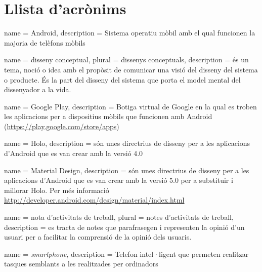 \chapter*{Llista d'acrònims}
\label{sec:glossary}


\begin{acronym}
\end{acronym}


{
name = Android, description = Sistema operatiu mòbil amb el qual funcionen la majoria de telèfons mòbils \cite{Android_OS}
}

{
name = disseny conceptual, plural = dissenys conceptuals, description = {és un tema, noció o idea amb el propòsit de comunicar una visió del disseny del sistema o producte. És la part del disseny del sistema que porta el model mental del dissenyador a la vida.}
}

{
name = Google Play, description = Botiga virtual de Google en la qual es troben les aplicacions per a dispositius mòbils que funcionen amb \gls{Android} (\url{https://play.google.com/store/apps})
}

{
name = Holo, description = són unes directrius de disseny per a les aplicacions d'\gls{Android} que es van crear amb la versió 4.0
}

{
name = Material Design, description = són unes directrius de disseny per a les aplicacions d'Android que es van crear amb la versió 5.0 per a substituir i millorar Holo. Per més informació \url{http://developer.android.com/design/material/index.html}
}

{
name = nota d'activitats de treball, plural = notes d'activitats de treball, description = es tracta de notes que parafrasegen i representen la opinió d'un usuari per a facilitar la comprensió de la opinió dels usuaris.  
}


{
name = \textit{smartphone}, description = Telefon intel·ligent que permeten realitzar tasques semblants a les realitzades per ordinadors 
}


